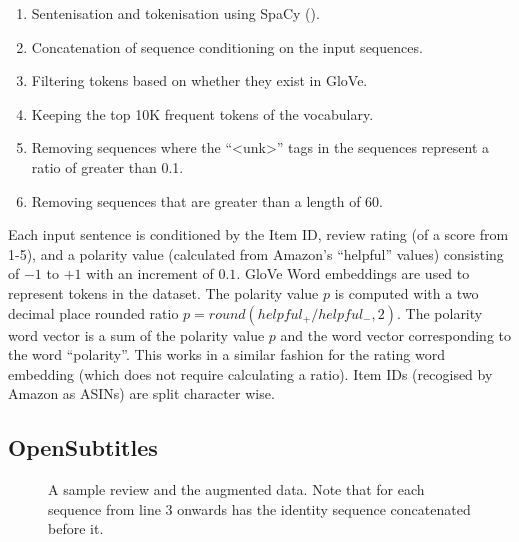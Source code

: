 \documentclass[12pt,twoside]{report}
\begin{document}

\begin{enumerate}  
	\item Sentenisation and tokenisation using SpaCy (\cite{honnibal_spacy_2017}).
	\item Concatenation of sequence conditioning on the input sequences.
	\item Filtering tokens based on whether they exist in GloVe.
	\item Keeping the top 10K frequent tokens of the vocabulary.
	\item Removing sequences where the ``\textless{}unk\textgreater'' tags in the sequences represent a ratio of greater than 0.1.
	\item Removing sequences that are greater than a length of 60. 
\end{enumerate}

Each input sentence is conditioned by the Item ID, review rating (of a score from 1-5), and a polarity value (calculated from Amazon's ``helpful'' values) consisting of $-1$ to $+1$ with an increment of $0.1$. GloVe Word embeddings are used to represent tokens in the dataset. The polarity value  $p$ is computed with a two decimal place rounded ratio $p=round(helpful_{+}/helpful_{-},2)$. The polarity word vector is a sum of the polarity value $p$ and the word vector corresponding to the word ``polarity''. This works in a similar fashion for the rating word embedding (which does not require calculating a ratio). Item IDs (recogised by Amazon as ASINs) are split character wise.

\subsection{OpenSubtitles}

\begin{figure}[!ht]
	\centering
	
	\caption{A sample review and the augmented data. Note that for each sequence from line 3 onwards has the identity sequence concatenated before it. \label{ex_dataset:subs}}
	\end{figure}
\end{document}

